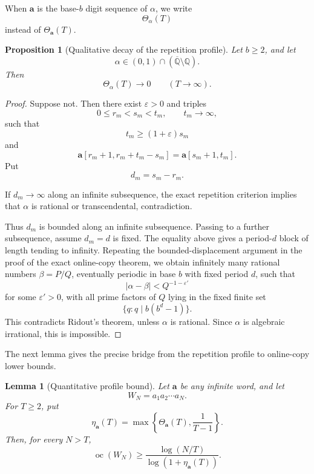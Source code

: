 \documentclass[11pt]{amsart}
\newtheorem{lemma}[theorem]{Lemma}
\newtheorem{proposition}[theorem]{Proposition}
\theoremstyle{definition}
\DeclareMathOperator{\oc}{oc}
\begin{document}
When \(\mathbf a\) is the base-\(b\) digit sequence of \(\alpha\), we write
\[
\Theta_\alpha(T)
\]
instead of \(\Theta_{\mathbf a}(T)\).

\begin{proposition}[Qualitative decay of the repetition profile]
Let \(b\geq 2\), and let
\[
\alpha\in(0,1)\cap(\overline{\mathbb Q}\setminus\mathbb Q).
\]
Then
\[
\Theta_\alpha(T)\to 0
\qquad(T\to\infty).
\]
\end{proposition}

\begin{proof}
Suppose not. Then there exist \(\varepsilon>0\) and triples
\[
0\leq r_m<s_m<t_m,
\qquad
t_m\to\infty,
\]
such that
\[
t_m\geq (1+\varepsilon)s_m
\]
and
\[
\mathbf a[r_m+1,r_m+t_m-s_m]
=
\mathbf a[s_m+1,t_m].
\]
Put
\[
d_m=s_m-r_m.
\]

If \(d_m\to\infty\) along an infinite subsequence, the exact repetition criterion implies that \(\alpha\) is rational or transcendental, contradiction.

Thus \(d_m\) is bounded along an infinite subsequence. Passing to a further subsequence, assume \(d_m=d\) is fixed. The equality above gives a period-\(d\) block of length tending to infinity. Repeating the bounded-displacement argument in the proof of the exact online-copy theorem, we obtain infinitely many rational numbers \(\beta=P/Q\), eventually periodic in base \(b\) with fixed period \(d\), such that
\[
|\alpha-\beta|<Q^{-1-\varepsilon'}
\]
for some \(\varepsilon'>0\), with all prime factors of \(Q\) lying in the fixed finite set
\[
\{q:q\mid b(b^d-1)\}.
\]
This contradicts Ridout's theorem, unless \(\alpha\) is rational. Since \(\alpha\) is algebraic irrational, this is impossible.
\end{proof}

The next lemma gives the precise bridge from the repetition profile to online-copy lower bounds.

\begin{lemma}[Quantitative profile bound]
Let \(\mathbf a\) be any infinite word, and let
\[
W_N=a_1a_2\cdots a_N.
\]
For \(T\geq 2\), put
\[
\eta_{\mathbf a}(T)
=
\max\left\{\Theta_{\mathbf a}(T),\frac1{T-1}\right\}.
\]
Then, for every \(N>T\),
\[
\oc(W_N)
\geq
\frac{\log(N/T)}{\log(1+\eta_{\mathbf a}(T))}.
\]
\end{lemma}
\end{document}

